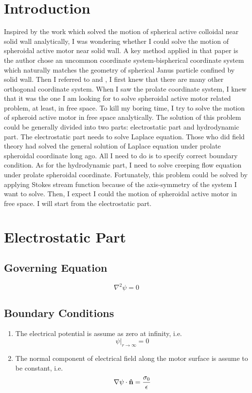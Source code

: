 \documentclass[fontsize=11pt, %
                             paper=a4, %
                             twoside, %
                             captions=tableheading,
                             index=totoc,
                             hyperref]{labbook}
\begin{document}
\section{Introduction}
Inspired by the work\cite{MozaffariSharifi-MoodKoplikEtAl2016}\cite{LeeLeal1980} which solved the motion of spherical active colloidal near solid wall analytically, I was wondering whether I could solve the motion of spheroidal active motor near solid wall. A key method applied in that paper is the author chose an uncommon coordinate system-bispherical coordinate system which naturally matches the geometry of spherical Janus particle confined by solid wall. Then I referred to \cite{MorseFeshbach1953} and \cite{MoonSpencer1988}, I first knew that there are many other orthogonal coordinate system. When I saw the prolate coordinate system, I knew that it was the one I am looking for to solve spheroidal active motor related problem, at least, in free space. To kill my boring time, I try to solve the motion of spheroid active motor in free space analytically. The solution of this problem could be generally divided into two parts: electrostatic part and hydrodynamic part. The electrostatic part needs to solve Laplace equation. Those who did field theory had solved the general solution of Laplace equation under prolate spheroidal coordinate long ago. All I need to do is to specify correct boundary condition. As for the hydrodynamic part, I need to solve creeping flow equation under prolate spheroidal coordinate. Fortunately, this problem could be solved by applying Stokes stream function\cite{HappelBrenner1983} because of the axis-symmetry of the system I want to solve. Then, I expect I could the motion of spheroidal active motor in free space. I will start from the electrostatic part.
\section{Electrostatic Part}
\subsection{Governing Equation}
\begin{equation}
\nabla^2\psi=0
\end{equation}
\subsection{Boundary Conditions}
\begin{enumerate}
\item
The electrical potential is assume as zero at infinity, i.e.
\begin{equation}
\psi|_{r\rightarrow\infty}=0
\end{equation}
\item
The normal component of electrical field along the motor surface is assume to be constant\cite{Kline2006}, i.e.
\begin{equation}
\nabla\psi \cdot \mathbf{\hat{n}} = \frac{\sigma_0}{\epsilon}
\end{equation}
\end{enumerate}
\end{document}
